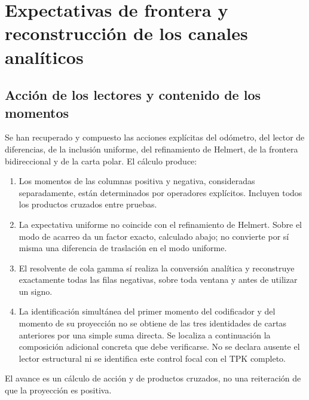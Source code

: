 \clearpage
\section[Expectativas de frontera y reconstrucción de los canales analíticos]{Expectativas de frontera y\\reconstrucción de los canales analíticos}
\label{viii:sec:lectores-gamma}


\subsection{Acción de los lectores y contenido de los momentos}
\label{viii:gamma-add-sub-5}

Se han recuperado y compuesto las acciones explícitas del odómetro, del lector de diferencias, de la inclusión uniforme, del refinamiento de Helmert, de la frontera bidireccional y de la carta polar. El cálculo produce:

\begin{enumerate}
\item Los momentos de las columnas positiva y negativa, consideradas separadamente, están determinados por operadores explícitos. Incluyen todos los productos cruzados entre pruebas.
\item La expectativa uniforme no coincide con el refinamiento de Helmert. Sobre el modo de acarreo da un factor exacto, calculado abajo; no convierte por sí misma una diferencia de traslación en el modo uniforme.
\item El resolvente de cola gamma sí realiza la conversión analítica y reconstruye exactamente todas las filas negativas, sobre toda ventana y antes de utilizar un signo.
\item La identificación simultánea del primer momento del codificador y del momento de su proyección no se obtiene de las tres identidades de cartas anteriores por una simple suma directa. Se localiza a continuación la composición adicional concreta que debe verificarse. No se declara ausente el lector estructural ni se identifica este control focal con el TPK completo.

\end{enumerate}
El avance es un cálculo de acción y de productos cruzados, no una reiteración de que la proyección es positiva.


